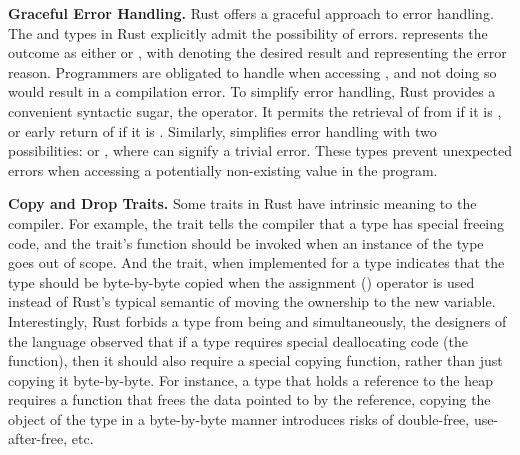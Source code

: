 \textbf{Graceful Error Handling.}
Rust offers a graceful approach to error handling.
The  and  types in Rust
explicitly admit the possibility of errors.
 represents the outcome as either  or ,
with  denoting the desired result
and  representing the error reason.
Programmers are obligated to handle  when accessing ,
and not doing so would result in a compilation error.
To simplify error handling,
Rust provides a convenient syntactic sugar,
the  operator.
It permits the retrieval of  from  if it is ,
or early return of  if it is .
Similarly,  simplifies error handling with two possibilities:
 or , where  can signify a trivial error.
These types prevent unexpected errors
when accessing a potentially non-existing value in the program.

\textbf{Copy and Drop Traits.}
Some traits in Rust have intrinsic meaning to the compiler. For example, the
 trait tells the compiler that a type has special freeing code, and
the  trait's  function should be invoked when an instance
of the type goes out of scope. And the  trait, when implemented for
a type indicates that the type should be byte-by-byte copied when the
assignment (\code{=}) operator is used instead of Rust's typical semantic
of moving the ownership to the new variable. Interestingly, Rust forbids a type
from being  and  simultaneously, the designers of the
language observed that if a type requires special deallocating code (the
 function), then it should also require a special copying function,
rather than just copying it byte-by-byte. For instance, a type that holds a
reference to the heap requires a  function that frees the data
pointed to by the reference, copying the object of the type in a byte-by-byte
manner introduces risks of double-free, use-after-free, etc.

